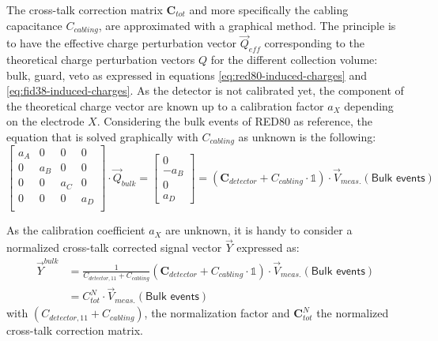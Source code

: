 The cross-talk correction matrix $\bm{C}_{tot}$ and more specifically the cabling capacitance $C_{cabling}$, are approximated with a graphical method. The principle is to have the effective charge perturbation vector $\vec{Q}_{eff}$ corresponding to the theoretical charge perturbation vectors $Q$ for the different collection volume: bulk, guard, veto as expressed in equations \ref{eq:red80-induced-charges} and \ref{eq:fid38-induced-charges}. As the detector is not calibrated yet, the component of the theoretical charge vector are known up to a calibration factor $a_X$ depending on the electrode $X$. Considering the bulk events of RED80 as reference, the equation that is solved graphically with $C_{cabling}$ as unknown is the following:
\begin{equation}
\label{eq:crosstalk-correction}
\begin{bmatrix}
a_A & 0 & 0 & 0 \\
0 & a_B & 0 & 0 \\
0 & 0 & a_C & 0 \\
0 & 0 & 0 & a_D \\
\end{bmatrix}
\cdot
\vec{Q}_{bulk}
=
\begin{bmatrix}
0 \\ -a_B \\ 0 \\ a_D
\end{bmatrix} 
=
\left( \bm{C}_{detector} + C_{cabling} \cdot \mathbb{1} \right) \cdot \vec{V}_{meas.}(\textsf{Bulk events})
\end{equation}

As the calibration coefficient $a_X$ are unknown, it is handy to consider a normalized cross-talk corrected signal vector $\vec{Y}$ expressed as:
\begin{equation}
\begin{split}
\vec{Y}^{bulk}
&=
\frac{1}{C_{detector, 11} + C_{cabling}}
\left( \bm{C}_{detector} + C_{cabling} \cdot \mathbb{1} \right) \cdot \vec{V}_{meas.}(\textsf{Bulk events})
\\
&= C_{tot}^N \cdot \vec{V}_{meas.}(\textsf{Bulk events})
\end{split}
\end{equation}
with $(C_{detector, 11} + C_{cabling})$, the normalization factor and $\bm{C}_{tot}^N$ the normalized cross-talk correction matrix.

